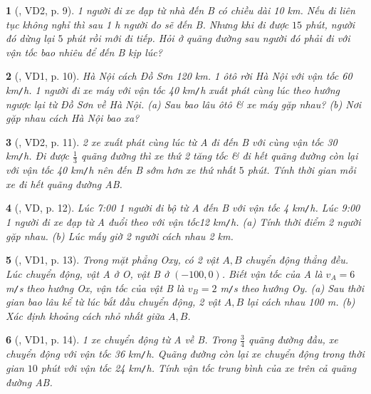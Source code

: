 \documentclass{article}
\newtheorem{baitoan}{}
\begin{document}
\begin{baitoan}[\cite{Van_Quyen_Hanh_Nhu_10_chuyen_Ly}, VD2, p. 9]
	1 người đi xe đạp từ nhà đến B có chiều dài {\rm10 km}. Nếu đi liên tục không nghỉ thì sau {\rm1 h} người đo sẽ đến B. Nhưng khi đi được $15$ phút, người đó dừng lại $5$ phút rồi mới đi tiếp. Hỏi ở quãng đường sau người đó phải đi với vận tốc bao nhiêu để đến B kịp lúc?
\end{baitoan}

\begin{baitoan}[\cite{Van_Quyen_Hanh_Nhu_10_chuyen_Ly}, VD1, p. 10]
	Hà Nội cách Đồ Sơn {\rm120 km}. 1 ôtô rời Hà Nội với vận tốc {\rm60 km{\tt/}h}. 1 người đi xe máy với vận tốc {\rm40 km{\tt/}h} xuất phát cùng lúc theo hướng ngược lại từ Đồ Sơn về Hà Nội. (a) Sau bao lâu ôtô \& xe máy gặp nhau? (b) Nơi gặp nhau cách Hà Nội bao xa?
\end{baitoan}

\begin{baitoan}[\cite{Van_Quyen_Hanh_Nhu_10_chuyen_Ly}, VD2, p. 11]
	2 xe xuất phát cùng lúc từ A đi đến B với cùng vận tốc {\rm30 km{\tt/}h}. Đi được $\frac{1}{3}$ quãng đường thì xe thứ 2 tăng tốc \& đi hết quãng đường còn lại với vận tốc {\rm40 km{\tt/}h} nên đến B sớm hơn xe thứ nhất $5$ phút. Tính thời gian mỗi xe đi hết quãng đường AB.
\end{baitoan}

\begin{baitoan}[\cite{Van_Quyen_Hanh_Nhu_10_chuyen_Ly}, VD, p. 12]
	Lúc {\rm7:00} 1 người đi bộ từ A đến B với vận tốc {\rm4 km{\tt/}h}. Lúc {\rm9:00} 1 người đi xe đạp từ A đuổi theo với vận tốc{\rm12 km{\tt/}h}. (a) Tính thời điểm 2 người gặp nhau. (b) Lúc mấy giờ 2 người cách nhau {\rm2 km}.
\end{baitoan}

\begin{baitoan}[\cite{Van_Quyen_Hanh_Nhu_10_chuyen_Ly}, VD1, p. 13]
	Trong mặt phẳng Oxy, có 2 vật $A,B$ chuyển động thẳng đều. Lúc chuyển động, vật A ở O, vật B ở $(-100,0)$. Biết vận tốc của A là $v_A = 6$ {\rm m{\tt/}s} theo hướng Ox, vận tốc của vật B là $v_B = 2$ {\rm m{\tt/}s} theo hướng Oy. (a) Sau thời gian bao lâu kể từ lúc bắt đầu chuyển động, 2 vật $A,B$ lại cách nhau {\rm100 m}. (b) Xác định khoảng cách nhỏ nhất giữa $A,B$.
\end{baitoan}

\begin{baitoan}[\cite{Van_Quyen_Hanh_Nhu_10_chuyen_Ly}, VD1, p. 14]
	1 xe chuyển động từ A về B. Trong $\frac{3}{4}$ quãng đường đầu, xe chuyển động với vận tốc {\rm36 km{\tt/}h}. Quãng đường còn lại xe chuyển động trong thời gian $10$ phút với vận tốc {\rm24 km{\tt/}h}. Tính vận tốc trung bình của xe trên cả quãng đường AB.
\end{baitoan}
\end{document}
